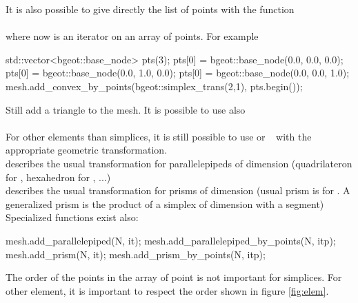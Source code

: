 \documentclass[11pt,a4paper]{article}
\begin{document}
It is also possible to give directly the list of points with the function\\[0.5cm]
\\[0.5cm]
where now  is an iterator on an array of points. For example\\[0.5cm]
\begin{cppcode}
  std::vector<bgeot::base\_node> pts(3);
  pts[0] = bgeot::base\_node(0.0, 0.0, 0.0);
  pts[0] = bgeot::base\_node(0.0, 1.0, 0.0);
  pts[0] = bgeot::base\_node(0.0, 0.0, 1.0);
  mesh.add\_convex\_by\_points(bgeot::simplex\_trans(2,1), pts.begin());
\end{cppcode}
Still add a triangle to the mesh.
It is possible to use also \\[0.5cm]
 \\[0.5cm]

For other elements than simplices, it is still possible to use  or $\ $$\ $  with the appropriate geometric transformation. \\[0.5cm]
describes the usual transformation for parallelepipeds of dimension  (quadrilateron for , hexahedron for , ...) \\[0.5cm]
describes the usual transformation for prisms of dimension  (usual prism is for . A generalized prism is the product of a simplex of dimension  with a segment) \\[0.5cm]
Specialized functions exist also: \\[0.5cm]
\begin{cppcode}
  mesh.add\_parallelepiped(N, it);
  mesh.add\_parallelepiped\_by\_points(N, itp);
  mesh.add\_prism(N, it);
  mesh.add\_prism\_by\_points(N, itp);
\end{cppcode}

The order of the points in the array of point is not important for simplices. For other element, it is important to respect the order shown in figure \ref{fig:elem}.
\end{document}
